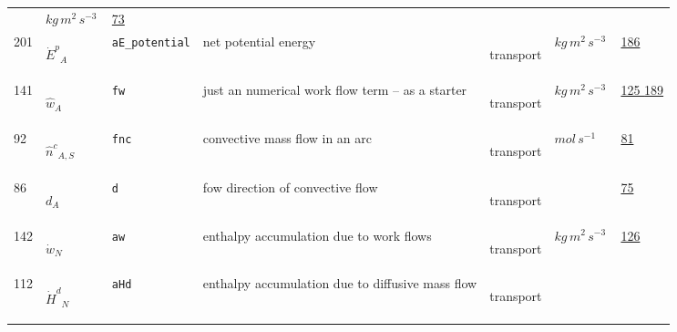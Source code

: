 \begin{longtable}{|p{1cm}|p{2.5cm}|p{4.5cm}|p{8cm}|p{3.0cm}|p{3cm}|p{1cm}|}
             & $ kg \,m^{2} \,s^{-3} \, $
             &                 \hyperlink{"e:73"}{ 73 }
                 \\
            201
             & \hypertarget{"v:201"}{ $ {{\dot{E}^p}}{_{A}} $}
             & \verb|aE_potential|
             & net potential energy
             & \begin{lay}transport \end{lay}
             & $ kg \,m^{2} \,s^{-3} \, $
             &                 \hyperlink{"e:186"}{ 186 }
                 \\
            141
             & \hypertarget{"v:141"}{ $ {{\hat{w}}}{_{A}} $}
             & \verb|fw|
             & just an numerical work flow term -- as a starter
             & \begin{lay}transport \end{lay}
             & $ kg \,m^{2} \,s^{-3} \, $
             &                 \hyperlink{"e:125"}{ 125 }
                                 \hyperlink{"e:189"}{ 189 }
                 \\
            92
             & \hypertarget{"v:92"}{ $ {{\hat{n}^c}}{_{A, S}} $}
             & \verb|fnc|
             & convective mass flow in an arc
             & \begin{lay}transport \end{lay}
             & $ mol \,s^{-1} \, $
             &                 \hyperlink{"e:81"}{ 81 }
                 \\
            86
             & \hypertarget{"v:86"}{ $ {d}{_{A}} $}
             & \verb|d|
             & fow direction of convective flow
             & \begin{lay}transport \end{lay}
             & $  $
             &                 \hyperlink{"e:75"}{ 75 }
                 \\
            142
             & \hypertarget{"v:142"}{ $ {{\dot{w}}}{_{N}} $}
             & \verb|aw|
             & enthalpy accumulation due to work flows
             & \begin{lay}transport \end{lay}
             & $ kg \,m^{2} \,s^{-3} \, $
             &                 \hyperlink{"e:126"}{ 126 }
                 \\
            112
             & \hypertarget{"v:112"}{ $ {{\dot{H}^d}}{_{N}} $}
             & \verb|aHd|
             & enthalpy accumulation due to diffusive mass flow
             & \begin{lay}transport \end{lay}

\end{longtable}
